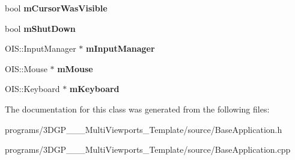 \begin{DoxyCompactItemize}
bool {\bfseries m\+Cursor\+Was\+Visible}
\item 
\mbox{\label{class_base_application_a755f26d3a9915aaf830750d877e39d86}} 
bool {\bfseries m\+Shut\+Down}
\item 
\mbox{\label{class_base_application_abc9503c8462e225b5d0d55c952d9e4a9}} 
O\+I\+S\+::\+Input\+Manager $\ast$ {\bfseries m\+Input\+Manager}
\item 
\mbox{\label{class_base_application_add9b97fbe64da2814d3af113bac58c43}} 
O\+I\+S\+::\+Mouse $\ast$ {\bfseries m\+Mouse}
\item 
\mbox{\label{class_base_application_a9d6e19cf50c47379fbaae55bff28079c}} 
O\+I\+S\+::\+Keyboard $\ast$ {\bfseries m\+Keyboard}
\end{DoxyCompactItemize}


The documentation for this class was generated from the following files\+:\begin{DoxyCompactItemize}
\item 
programs/3\+D\+G\+P\+\_\+\_\+\_\+\+Multi\+Viewports\+\_\+\+Template/source/Base\+Application.\+h\item 
programs/3\+D\+G\+P\+\_\+\_\+\_\+\+Multi\+Viewports\+\_\+\+Template/source/Base\+Application.\+cpp\end{DoxyCompactItemize}
